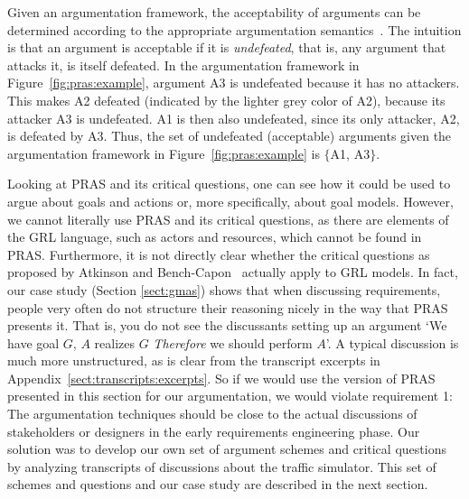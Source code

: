 Given an argumentation framework, the acceptability of arguments can be determined according to the appropriate argumentation semantics~\cite{Dung1995}. The intuition is that an argument is acceptable if it is \emph{undefeated}, that is, any argument that attacks it, is itself defeated. In the argumentation framework in Figure~\ref{fig:pras:example}, argument A3 is undefeated because it has no attackers. This makes A2 defeated (indicated by the lighter grey color of A2), because its attacker A3 is undefeated. A1 is then also undefeated, since its only attacker, A2, is defeated by A3. Thus, the set of undefeated (acceptable) arguments given the argumentation framework in Figure~\ref{fig:pras:example} is $\{$A1, A3$\}$.

Looking at PRAS and its critical questions, one can see how it could be used to argue about goals and actions or, more specifically, about goal models. However, we cannot literally use PRAS and its critical questions, as there are elements of the GRL language, such as actors and resources, which cannot be found in PRAS. Furthermore, it is not directly clear whether the critical questions as proposed by Atkinson and Bench-Capon~\cite{atkinson2007} actually apply to GRL models. In fact, our case study (Section \ref{sect:gmas}) shows that when discussing requirements, people very often do not structure their reasoning nicely in the way that PRAS presents it. That is, you do not see the discussants setting up an argument `We have goal $G$, $A$ realizes $G$ \emph{Therefore} we should perform $A$'. A typical discussion is much more unstructured, as is clear from the transcript excerpts in Appendix~\ref{sect:transcripts:excerpts}. So if we would use the version of PRAS presented in this section for our argumentation, we would violate requirement 1: The argumentation techniques should be close to the actual discussions of stakeholders or designers in the early requirements engineering phase. Our solution was to develop our own set of argument schemes and critical questions by analyzing transcripts of discussions about the traffic simulator. This set of schemes and questions and our case study are described in the next section. 

